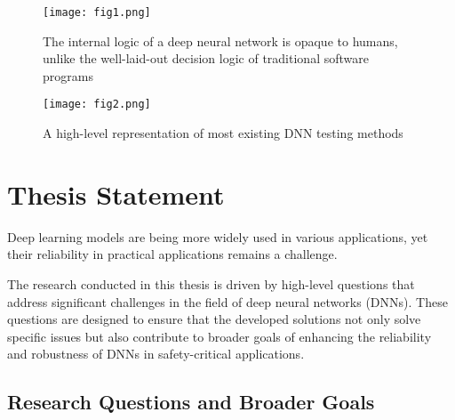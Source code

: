 \begin{figure*}[h]
	\centering
	\texttt{[image: fig1.png]}
	\caption{The internal logic of a deep neural network is opaque to humans, unlike the well-laid-out decision logic of traditional software programs \cite{Intro_1}}
	\label{fig:1}
\end{figure*}

\begin{figure*}[h]
	\centering
	\texttt{[image: fig2.png]}
	\caption{A high-level representation of most existing DNN testing methods \cite{Intro_1}}
	\label{fig:2}
\end{figure*}



\section{Thesis Statement}

Deep learning models are being more widely used in various applications, yet their reliability in practical applications remains a challenge.


The research conducted in this thesis is driven by high-level questions that address significant challenges in the field of deep neural networks (DNNs). These questions are designed to ensure that the developed solutions not only solve specific issues but also contribute to broader goals of enhancing the reliability and robustness of DNNs in safety-critical applications.

\subsection{Research Questions and Broader Goals}

